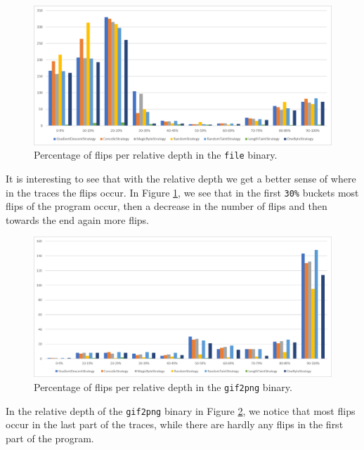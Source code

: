\begin{figure}[H]
    \centering
    \includegraphics[width=.8\linewidth]{5_results/graphs/file-depth-relative.png}  
    \caption{Percentage of flips per relative depth in the \texttt{file} binary.}
    \label{fig:fileDepthRelative}
\end{figure}
It is interesting to see that with the relative depth we get a better sense of where in the traces the flips occur. In Figure \ref{fig:fileDepthRelative}, we see that in the first \texttt{30\%} buckets most flips of the program occur, then a decrease in the number of flips and then towards the end again more flips.

\begin{figure}[H]
    \centering
    \includegraphics[width=.8\linewidth]{5_results/graphs/gif2png-depth-relative.png}  
    \caption{Percentage of flips per relative depth in the \texttt{gif2png} binary.}
    \label{fig:gif2pngDepthRelative}
\end{figure}
In the relative depth of the \texttt{gif2png} binary in Figure \ref{fig:gif2pngDepthRelative}, we notice that most flips occur in the last part of the traces, while there are hardly any flips in the first part of the program.


